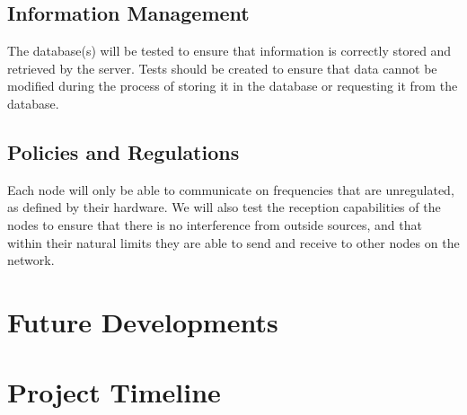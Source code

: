 \documentclass[tikz,a4paper,titlepage]{article}
\begin{document}
\subsection{Information Management} %

The database(s) will be tested to ensure that information is correctly stored and retrieved by the server. Tests should be created to ensure that data cannot be modified during the process of storing it in the database or requesting it from the database. 

\subsection{Policies and Regulations}

Each node will only be able to communicate on frequencies that are unregulated, as defined by their hardware. We will also test the reception capabilities of the nodes to ensure that there is no interference from outside sources, and that within their natural limits they are able to send and receive to other nodes on the network.

\section{Future Developments}

\section{Project Timeline}
\end{document}
